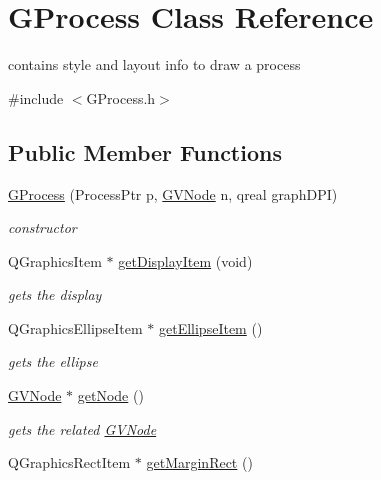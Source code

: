 \hypertarget{class_g_process}{\section{\-G\-Process \-Class \-Reference}
\label{class_g_process}
}


contains style and layout info to draw a process  




{\ttfamily \#include $<$\-G\-Process.\-h$>$}

\subsection*{\-Public \-Member \-Functions}
\begin{DoxyCompactItemize}
\item 
\hyperlink{class_g_process_a4547d1c5884879d599de7b5de2cf7fcb}{\-G\-Process} (\-Process\-Ptr p, \hyperlink{struct_g_v_node}{\-G\-V\-Node} n, qreal graph\-D\-P\-I)
\begin{DoxyCompactList}\small\item\em constructor \end{DoxyCompactList}\item 
\-Q\-Graphics\-Item $\ast$ \hyperlink{class_g_process_abc8cdf8bb0a8402a1b507005be3a97f9}{get\-Display\-Item} (void)
\begin{DoxyCompactList}\small\item\em gets the display \end{DoxyCompactList}\item 
\hypertarget{class_g_process_a3b19ac4a7cd4558a7e5d78b83f2e1bd8}{\-Q\-Graphics\-Ellipse\-Item $\ast$ \hyperlink{class_g_process_a3b19ac4a7cd4558a7e5d78b83f2e1bd8}{get\-Ellipse\-Item} ()}\label{class_g_process_a3b19ac4a7cd4558a7e5d78b83f2e1bd8}

\begin{DoxyCompactList}\small\item\em gets the ellipse \end{DoxyCompactList}\item 
\hyperlink{struct_g_v_node}{\-G\-V\-Node} $\ast$ \hyperlink{class_g_process_a9d26b9dad04fd1cb89851d9ae0a3be0f}{get\-Node} ()
\begin{DoxyCompactList}\small\item\em gets the related \hyperlink{struct_g_v_node}{\-G\-V\-Node} \end{DoxyCompactList}\item 
\hypertarget{class_g_process_ad369ac5613ff46bcabf93eafd37f006e}{\-Q\-Graphics\-Rect\-Item $\ast$ \hyperlink{class_g_process_ad369ac5613ff46bcabf93eafd37f006e}{get\-Margin\-Rect} ()}\label{class_g_process_ad369ac5613ff46bcabf93eafd37f006e}


\end{DoxyCompactItemize}
